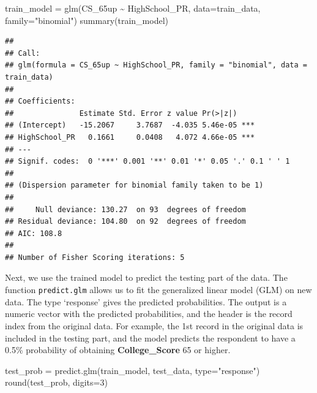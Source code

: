 \documentclass[
]{article}
\newenvironment{Shaded}{\begin{snugshade}}{\end{snugshade}}
\newcommand{\AttributeTok}[1]{\textcolor[rgb]{0.77,0.63,0.00}{#1}}
\newcommand{\DecValTok}[1]{\textcolor[rgb]{0.00,0.00,0.81}{#1}}
\newcommand{\FunctionTok}[1]{\textcolor[rgb]{0.00,0.00,0.00}{#1}}
\newcommand{\NormalTok}[1]{#1}
\newcommand{\OtherTok}[1]{\textcolor[rgb]{0.56,0.35,0.01}{#1}}
\newcommand{\SpecialCharTok}[1]{\textcolor[rgb]{0.00,0.00,0.00}{#1}}
\newcommand{\StringTok}[1]{\textcolor[rgb]{0.31,0.60,0.02}{#1}}
\begin{document}
\begin{Shaded}
\begin{Highlighting}[]
\NormalTok{train\_model }\OtherTok{=} \FunctionTok{glm}\NormalTok{(CS\_65up }\SpecialCharTok{\textasciitilde{}}\NormalTok{ HighSchool\_PR, }\AttributeTok{data=}\NormalTok{train\_data, }\AttributeTok{family=}\StringTok{"binomial"}\NormalTok{)}
\FunctionTok{summary}\NormalTok{(train\_model)}
\end{Highlighting}
\end{Shaded}

\begin{verbatim}
## 
## Call:
## glm(formula = CS_65up ~ HighSchool_PR, family = "binomial", data = train_data)
## 
## Coefficients:
##               Estimate Std. Error z value Pr(>|z|)    
## (Intercept)   -15.2067     3.7687  -4.035 5.46e-05 ***
## HighSchool_PR   0.1661     0.0408   4.072 4.66e-05 ***
## ---
## Signif. codes:  0 '***' 0.001 '**' 0.01 '*' 0.05 '.' 0.1 ' ' 1
## 
## (Dispersion parameter for binomial family taken to be 1)
## 
##     Null deviance: 130.27  on 93  degrees of freedom
## Residual deviance: 104.80  on 92  degrees of freedom
## AIC: 108.8
## 
## Number of Fisher Scoring iterations: 5
\end{verbatim}

Next, we use the trained model to predict the testing part of the data.
The function \texttt{predict.glm} allows us to fit the generalized
linear model (GLM) on new data. The type `response' gives the predicted
probabilities. The output is a numeric vector with the predicted
probabilities, and the header is the record index from the original
data. For example, the 1st record in the original data is included in
the testing part, and the model predicts the respondent to have a 0.5\%
probability of obtaining \textbf{College\_Score} 65 or higher.

\begin{Shaded}
\begin{Highlighting}[]
\NormalTok{test\_prob }\OtherTok{=} \FunctionTok{predict.glm}\NormalTok{(train\_model, test\_data, }\AttributeTok{type=}\StringTok{"response"}\NormalTok{)}
\FunctionTok{round}\NormalTok{(test\_prob, }\AttributeTok{digits=}\DecValTok{3}\NormalTok{)}
\end{Highlighting}
\end{Shaded}
\end{document}
